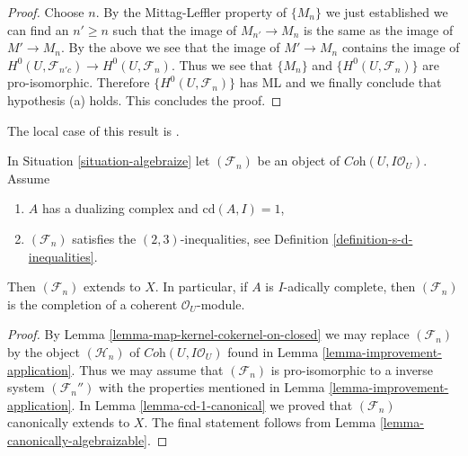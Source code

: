 \begin{proof}
\medskip\noindent
Choose $n$. By the Mittag-Leffler property of $\{M_n\}$ we just established
we can find an $n' \geq n$ such that the image of $M_{n'} \to M_n$
is the same as the image of $M' \to M_n$. By the above we see that
the image of $M' \to M_n$ contains the image of
$H^0(U, \mathcal{F}_{n'c}) \to H^0(U, \mathcal{F}_n)$.
Thus we see that $\{M_n\}$ and $\{H^0(U, \mathcal{F}_n)\}$
are pro-isomorphic. Therefore $\{H^0(U, \mathcal{F}_n)\}$
has ML and we finally conclude that hypothesis (a) holds.
This concludes the proof.
\end{proof}

\begin{proposition}
\label{proposition-cd-1}
\begin{reference}
The local case of this result is \cite[IV Corollaire 2.9]{MRaynaud-book}.
\end{reference}
In Situation \ref{situation-algebraize} let $(\mathcal{F}_n)$
be an object of $\textit{Coh}(U, I\mathcal{O}_U)$. Assume
\begin{enumerate}
\item $A$ has a dualizing complex and $\text{cd}(A, I) = 1$,
\item $(\mathcal{F}_n)$ satisfies the $(2, 3)$-inequalities, see
Definition \ref{definition-s-d-inequalities}.
\end{enumerate}
Then $(\mathcal{F}_n)$ extends to $X$. In particular, if $A$ is
$I$-adically complete, then $(\mathcal{F}_n)$ is the completion
of a coherent $\mathcal{O}_U$-module.
\end{proposition}

\begin{proof}
By Lemma \ref{lemma-map-kernel-cokernel-on-closed}
we may replace $(\mathcal{F}_n)$ by the object $(\mathcal{H}_n)$
of $\textit{Coh}(U, I\mathcal{O}_U)$ found in
Lemma \ref{lemma-improvement-application}.
Thus we may assume that $(\mathcal{F}_n)$ is pro-isomorphic
to a inverse system $(\mathcal{F}_n'')$ with the properties
mentioned in Lemma \ref{lemma-improvement-application}.
In Lemma \ref{lemma-cd-1-canonical} we proved that
$(\mathcal{F}_n)$ canonically extends to $X$.
The final statement follows from Lemma \ref{lemma-canonically-algebraizable}.
\end{proof}

